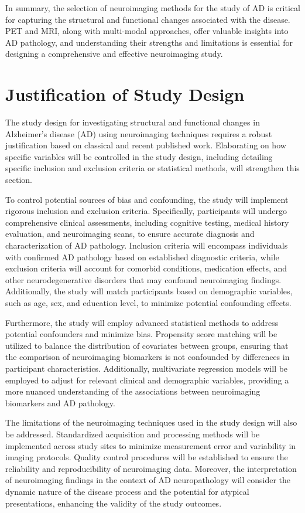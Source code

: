\documentclass[10pt]{article}
\begin{document}
\begin{sloppypar}
  In summary, the selection of neuroimaging methods for the study of AD is critical for capturing the structural and functional changes associated with the disease. PET and MRI, along with multi-modal approaches, offer valuable insights into AD pathology, and understanding their strengths and limitations is essential for designing a comprehensive and effective neuroimaging study.

  \section{Justification of Study Design}
  \label{sec:justification-of-study-design}

  The study design for investigating structural and functional changes in Alzheimer's disease (AD) using neuroimaging techniques requires a robust justification based on classical and recent published work. Elaborating on how specific variables will be controlled in the study design, including detailing specific inclusion and exclusion criteria or statistical methods, will strengthen this section.

  To control potential sources of bias and confounding, the study will implement rigorous inclusion and exclusion criteria. Specifically, participants will undergo comprehensive clinical assessments, including cognitive testing, medical history evaluation, and neuroimaging scans, to ensure accurate diagnosis and characterization of AD pathology. Inclusion criteria will encompass individuals with confirmed AD pathology based on established diagnostic criteria, while exclusion criteria will account for comorbid conditions, medication effects, and other neurodegenerative disorders that may confound neuroimaging findings. Additionally, the study will match participants based on demographic variables, such as age, sex, and education level, to minimize potential confounding effects.

  Furthermore, the study will employ advanced statistical methods to address potential confounders and minimize bias. Propensity score matching will be utilized to balance the distribution of covariates between groups, ensuring that the comparison of neuroimaging biomarkers is not confounded by differences in participant characteristics. Additionally, multivariate regression models will be employed to adjust for relevant clinical and demographic variables, providing a more nuanced understanding of the associations between neuroimaging biomarkers and AD pathology.

  The limitations of the neuroimaging techniques used in the study design will also be addressed. Standardized acquisition and processing methods will be implemented across study sites to minimize measurement error and variability in imaging protocols. Quality control procedures will be established to ensure the reliability and reproducibility of neuroimaging data. Moreover, the interpretation of neuroimaging findings in the context of AD neuropathology will consider the dynamic nature of the disease process and the potential for atypical presentations, enhancing the validity of the study outcomes.


\end{sloppypar}
\end{document}
